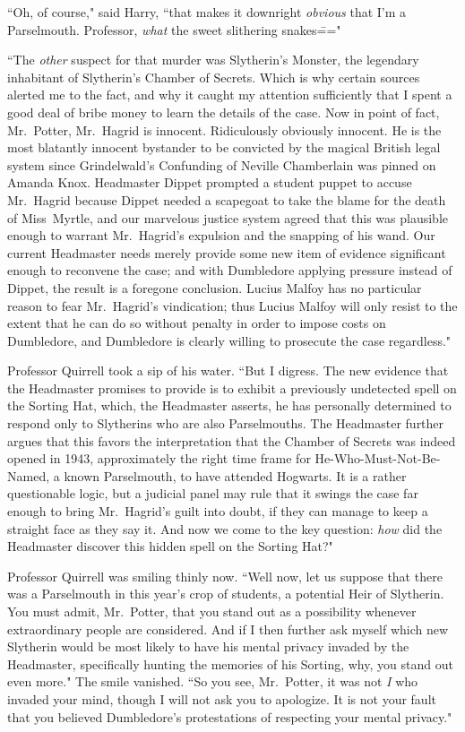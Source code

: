 ``Oh, of course," said Harry, ``that makes it downright \emph{obvious} that I'm a Parselmouth. Professor, \emph{what} the sweet slithering snakes\==="

``The \emph{other} suspect for that murder was Slytherin's Monster, the legendary inhabitant of Slytherin's Chamber of Secrets. Which is why certain sources alerted me to the fact, and why it caught my attention sufficiently that I spent a good deal of bribe money to learn the details of the case. Now in point of fact, Mr.~Potter, Mr.~Hagrid is innocent. Ridiculously obviously innocent. He is the most blatantly innocent bystander to be convicted by the magical British legal system since Grindelwald's Confunding of Neville Chamberlain was pinned on Amanda Knox. Headmaster Dippet prompted a student puppet to accuse Mr.~Hagrid because Dippet needed a scapegoat to take the blame for the death of Miss~Myrtle, and our marvelous justice system agreed that this was plausible enough to warrant Mr.~Hagrid's expulsion and the snapping of his wand. Our current Headmaster needs merely provide some new item of evidence significant enough to reconvene the case; and with Dumbledore applying pressure instead of Dippet, the result is a foregone conclusion. Lucius Malfoy has no particular reason to fear Mr.~Hagrid's vindication; thus Lucius Malfoy will only resist to the extent that he can do so without penalty in order to impose costs on Dumbledore, and Dumbledore is clearly willing to prosecute the case regardless."

Professor Quirrell took a sip of his water. ``But I digress. The new evidence that the Headmaster promises to provide is to exhibit a previously undetected spell on the Sorting Hat, which, the Headmaster asserts, he has personally determined to respond only to Slytherins who are also Parselmouths. The Headmaster further argues that this favors the interpretation that the Chamber of Secrets was indeed opened in 1943, approximately the right time frame for He-Who-Must-Not-Be-Named, a known Parselmouth, to have attended Hogwarts. It is a rather questionable logic, but a judicial panel may rule that it swings the case far enough to bring Mr.~Hagrid's guilt into doubt, if they can manage to keep a straight face as they say it. And now we come to the key question: \emph{how} did the Headmaster discover this hidden spell on the Sorting Hat?"

Professor Quirrell was smiling thinly now. ``Well now, let us suppose that there was a Parselmouth in this year's crop of students, a potential Heir of Slytherin. You must admit, Mr.~Potter, that you stand out as a possibility whenever extraordinary people are considered. And if I then further ask myself which new Slytherin would be most likely to have his mental privacy invaded by the Headmaster, specifically hunting the memories of his Sorting, why, you stand out even more." The smile vanished. ``So you see, Mr.~Potter, it was not \emph{I} who invaded your mind, though I will not ask you to apologize. It is not your fault that you believed Dumbledore's protestations of respecting your mental privacy."


